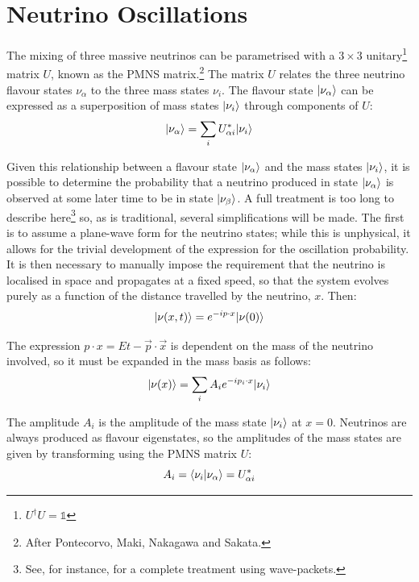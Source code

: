 \section{Neutrino Oscillations}\label{sec:neutrino_oscillations}
The mixing of three massive neutrinos can be parametrised with a $3\times 3$ unitary\footnote{$U^\dagger U = \mathbb{1}$} matrix $U$, known as the PMNS matrix.\footnote{After Pontecorvo, Maki, Nakagawa and Sakata.} The matrix $U$ relates the three neutrino flavour states $\nu_\alpha$ to the three mass states $\nu_i$. The flavour state $|\nu_{\alpha}\rangle$ can be expressed as a superposition of mass states $|\nu_{i}\rangle$ through components of $U$\citep{Kayser1981}:
\begin{equation}\label{eqn:flavour_mass_mixing}
|\nu_{\alpha}\rangle = \sum_i U_{\alpha i}^* |\nu_{i}\rangle
\end{equation}

Given this relationship between a flavour state $|\nu_{\alpha}\rangle$ and the mass states $|\nu_{i}\rangle$, it is possible to determine the probability that a neutrino produced in state $|\nu_{\alpha}\rangle$ is observed at some later time to be in state $|\nu_{\beta}\rangle$. A full treatment is too long to describe here\footnote{See, for instance, \citep{Kayser1981} for a complete treatment using wave-packets.} so, as is traditional, several simplifications will be made. The first is to assume a plane-wave form for the neutrino states; while this is unphysical, it allows for the trivial development of the expression for the oscillation probability. It is then necessary to manually impose the requirement that the neutrino is localised in space and propagates at a fixed speed, so that the system evolves purely as a function of the distance travelled by the neutrino, $x$. Then:
\begin{equation}\label{eqn:plane_wave_nu_propagation}
|\nu(x,t)\rangle = e^{-i p\cdot x}|\nu(0)\rangle 
\end{equation}

The expression $p\cdot x = Et - \vec{p}\cdot\vec{x}$ is dependent on the mass of the neutrino involved, so it must be expanded in the mass basis as follows:
\begin{equation}\label{eqn:mass_expansion_of_propagation}
|\nu(x)\rangle = \sum_i A_i e^{-i p_i\cdot x}  |\nu_{i}\rangle
\end{equation}

The amplitude $A_i$ is the amplitude of the mass state $|\nu_{i}\rangle$ at $x=0$. Neutrinos are always produced as flavour eigenstates, so the amplitudes of the mass states are given by transforming using the PMNS matrix $U$:
\begin{equation}\label{eqn:mass_state_amplitudes}
A_i = \langle \nu_i|\nu_\alpha\rangle = U_{\alpha i}^*
\end{equation}

